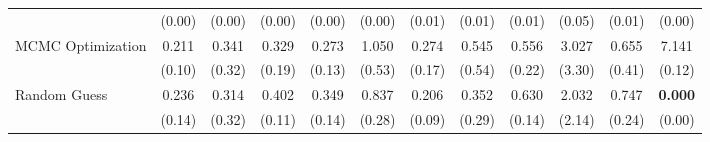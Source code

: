 \begin{table}[ht]
{\begin{tabular}{l cccc cccc cc c}
             & (0.00) & (0.00) & (0.00) & (0.00) & (0.00) & (0.01) & (0.01) & (0.01) & (0.05) & (0.01) & (0.00) \\
            \addlinespace[0.2em]
            MCMC Optimization & 0.211 & 0.341 & 0.329 & 0.273 & 1.050 & 0.274 & 0.545 & 0.556 & 3.027 & 0.655 & 7.141 \\
             & (0.10) & (0.32) & (0.19) & (0.13) & (0.53) & (0.17) & (0.54) & (0.22) & (3.30) & (0.41) & (0.12) \\
            \addlinespace[0.2em]
            Random Guess & 0.236 & 0.314 & 0.402 & 0.349 & 0.837 & 0.206 & 0.352 & 0.630 & 2.032 & 0.747 & \textbf{0.000} \\
             & (0.14) & (0.32) & (0.11) & (0.14) & (0.28) & (0.09) & (0.29) & (0.14) & (2.14) & (0.24) & (0.00) \\
            \bottomrule
        \end{tabular}%
    }
\end{table}
